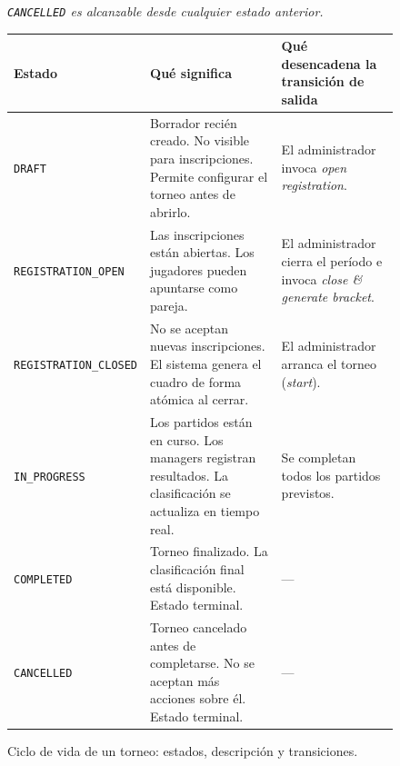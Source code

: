 \begin{figure}[ht]
\centering
{}

\vspace{0.4em}
\footnotesize\textit{\texttt{CANCELLED} es alcanzable desde cualquier estado anterior.}
\vspace{0.8em}

\renewcommand{\arraystretch}{1.25}
\begin{tabularx}{\textwidth}{lXX}
\hline
\textbf{Estado} & \textbf{Qué significa} & \textbf{Qué desencadena la transición de salida} \\
\hline
\texttt{DRAFT} &
  Borrador recién creado. No visible para inscripciones. Permite configurar el torneo antes de abrirlo. &
  El administrador invoca \textit{open registration}. \\
\texttt{REGISTRATION\_OPEN} &
  Las inscripciones están abiertas. Los jugadores pueden apuntarse como pareja. &
  El administrador cierra el período e invoca \textit{close \& generate bracket}. \\
\texttt{REGISTRATION\_CLOSED} &
  No se aceptan nuevas inscripciones. El sistema genera el cuadro de forma atómica al cerrar. &
  El administrador arranca el torneo (\textit{start}). \\
\texttt{IN\_PROGRESS} &
  Los partidos están en curso. Los managers registran resultados. La clasificación se actualiza en tiempo real. &
  Se completan todos los partidos previstos. \\
\texttt{COMPLETED} &
  Torneo finalizado. La clasificación final está disponible. Estado terminal. &
  — \\
\texttt{CANCELLED} &
  Torneo cancelado antes de completarse. No se aceptan más acciones sobre él. Estado terminal. &
  — \\
\hline
\end{tabularx}
\caption{Ciclo de vida de un torneo: estados, descripción y transiciones.}
\label{fig:ciclo_torneo}
\end{figure}

